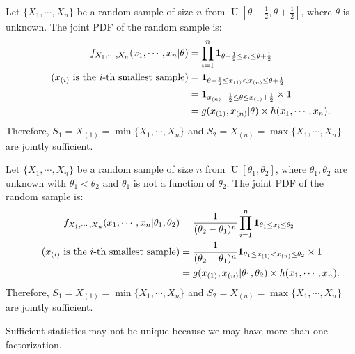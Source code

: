 \documentclass{huhtakm-template-book-v2}
\DeclareMathOperator{\U}{U}
\begin{document}
    \begin{eg}
        Let $\{X_{1}, \cdots, X_{n}\}$ be a random sample of size $n$ from $\U[\theta - \frac{1}{2}, \theta + \frac{1}{2}]$, where $\theta$ is unknown. The joint PDF of the random sample is:
        \begin{align*}
            f_{X_{1}, \cdots, X_{n}}(x_{1}, \cdots, x_{n} | \theta) &= \prod_{i=1}^{n} \mathbf{1}_{\theta - \frac{1}{2} \leq x_{i} \leq \theta + \frac{1}{2}}\\
            \tag{$x_{(i)}$ is the $i$-th smallest sample}
            &= \mathbf{1}_{\theta - \frac{1}{2} \leq x_{(1)} < x_{(n)} \leq \theta + \frac{1}{2}}\\
            &= \mathbf{1}_{x_{(n)} - \frac{1}{2} \leq \theta \leq x_{(1)} + \frac{1}{2}} \times 1\\
            &= g(x_{(1)}, x_{(n)} | \theta) \times h(x_{1}, \cdots, x_{n}).
        \end{align*}
        Therefore, $S_{1} = X_{(1)} = \min\{X_{1}, \cdots, X_{n}\}$ and $S_{2} = X_{(n)} = \max\{X_{1}, \cdots, X_{n}\}$ are jointly sufficient.
    \end{eg}
    \begin{eg}
        Let $\{X_{1}, \cdots, X_{n}\}$ be a random sample of size $n$ from $\U[\theta_{1}, \theta_{2}]$, where $\theta_{1}, \theta_{2}$ are unknown with $\theta_{1} < \theta_{2}$ and $\theta_{1}$ is not a function of $\theta_{2}$. The joint PDF of the random sample is:
        \begin{align*}
            f_{X_{1}, \cdots, X_{n}}(x_{1}, \cdots, x_{n} | \theta_{1}, \theta_{2}) &= \frac{1}{(\theta_{2} - \theta_{1})^{n}} \prod_{i=1}^{n} \mathbf{1}_{\theta_{1} \leq x_{i} \leq \theta_{2}}\\
            \tag{$x_{(i)}$ is the $i$-th smallest sample}
            &= \frac{1}{(\theta_{2} - \theta_{1})^{n}} \mathbf{1}_{\theta_{1} \leq x_{(1)} < x_{(n)} \leq \theta_{2}} \times 1\\
            &= g(x_{(1)}, x_{(n)} | \theta_{1}, \theta_{2}) \times h(x_{1}, \cdots, x_{n}).
        \end{align*}
        Therefore, $S_{1} = X_{(1)} = \min\{X_{1}, \cdots, X_{n}\}$ and $S_{2} = X_{(n)} = \max\{X_{1}, \cdots, X_{n}\}$ are jointly sufficient.
    \end{eg}
    \begin{rem}
        Sufficient statistics may not be unique because we may have more than one factorization.
    \end{rem}
\end{document}
